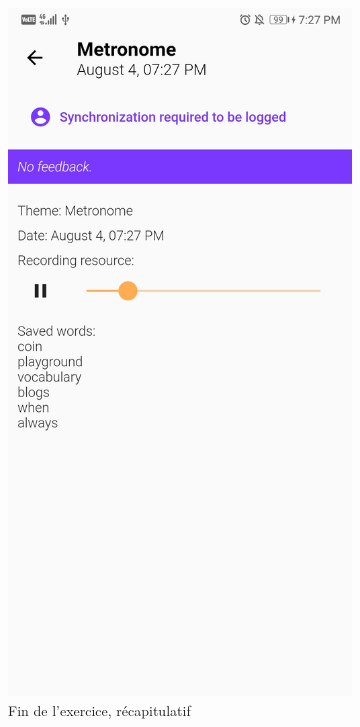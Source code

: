 \begin{appendices}
\begin{landscape}
\begin{figure}[h]
\begin{subfigure}{.25\textwidth}
    \includegraphics[width=.75\linewidth]{content/imgs/screen6.jpg}
    \caption{Fin de l'exercice, récapitulatif}
  \end{subfigure}%
  \begin{subfigure}{.25\textwidth}
    \centering

\end{subfigure}
\end{figure}
\end{landscape}
\end{appendices}
